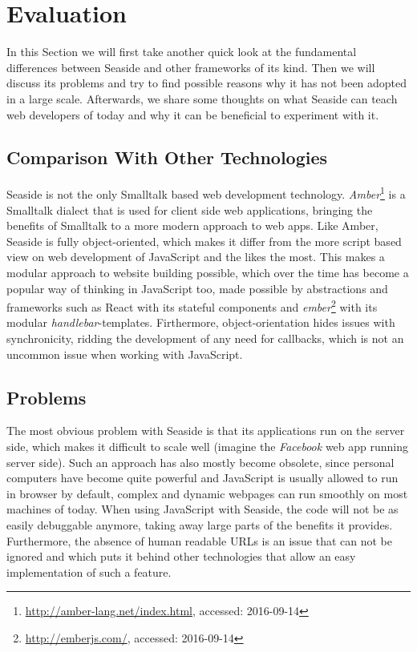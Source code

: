 \documentclass[a4paper,12pt,pagesize,headsepline,oribibl,titlepage]{scrartcl}
\begin{document}
\section{Evaluation}
\label{sec:evaluation}

In this Section we will first take another quick look at the fundamental differences between Seaside and other frameworks of its kind. Then we will discuss its problems and try to find possible reasons why it has not been adopted in a large scale. Afterwards, we share some thoughts on what Seaside can teach web developers of today and why it can be beneficial to experiment with it.

\subsection{Comparison With Other Technologies}

Seaside is not the only Smalltalk based web development technology. \emph{Amber}\footnote{\url{http://amber-lang.net/index.html}, accessed: 2016-09-14} is a Smalltalk dialect that is used for client side web applications, bringing the benefits of Smalltalk to a more modern approach to web apps.
Like Amber, Seaside is fully object-oriented, which makes it differ from the more script based view on web development of JavaScript and the likes the most. This makes a modular approach to website building possible, which over the time has become a popular way of thinking in JavaScript too, made possible by abstractions and frameworks such as React with its stateful components and \emph{ember}\footnote{\url{http://emberjs.com/}, accessed: 2016-09-14} with its modular \emph{handlebar}-templates. Firthermore, object-orientation hides issues with synchronicity, ridding the development of any need for callbacks, which is not an uncommon issue when working with JavaScript.


\subsection{Problems}

The most obvious problem with Seaside is that its applications run on the server side, which makes it difficult to scale well (imagine the \emph{Facebook} web app running server side). Such an approach has also mostly become obsolete, since personal computers have become quite powerful and JavaScript is usually allowed to run in browser by default, complex and dynamic webpages can run smoothly on most machines of today. When using JavaScript with Seaside, the code will not be as easily debuggable anymore, taking away large parts of the benefits it provides. Furthermore, the absence of human readable URLs is an issue that can not be ignored and which puts it behind other technologies that allow an easy implementation of such a feature. 
\end{document}
